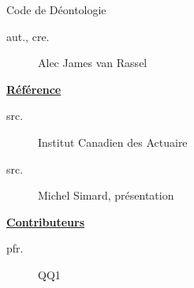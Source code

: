 \begin{contrib}{Code de Déontologie}
\begin{description}
	\item[aut., cre.] Alec James van Rassel
\end{description}

\textbf{\underline{Référence}}
\begin{description}
	\item[src.] Institut Canadien des Actuaire
	\item[src.] Michel Simard, présentation
\end{description}

\textbf{\underline{Contributeurs}}
\begin{description}
	\item[pfr.]	QQ1
\end{description}
\end{contrib}
